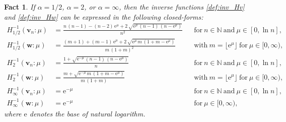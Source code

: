 \documentclass[conference, draftcls, onecolumn]{IEEEtran}
\theoremstyle{plain}
\newtheorem{fact}{Fact}
\newcommand{\bvec}[1]{\boldsymbol{#1}}
\begin{document}
\begin{fact}
\label{ex:renyi}
If $\alpha = 1/2$, $\alpha = 2$, or $\alpha = \infty$, then the inverse functions \eqref{def:inv_Hv} and \eqref{def:inv_Hw} can be expressed in the following closed-forms:
\begin{align}
H_{1/2}^{-1}( \bvec{v}_{n} : \mu )
& =
\frac{ n \, (n - 1) - (n-2) \, \mathrm{e}^{\mu} + 2 \, \sqrt{ \mathrm{e}^{\mu} \, (n-1) \, (n-\mathrm{e}^{\mu}) } }{ n^{2} }
&& \mathrm{for} \ n \in \mathbb{N} \ \mathrm{and} \ \mu \in [0, \ln n] ,
\\
H_{1/2}^{-1}( \bvec{w} : \mu )
& =
\frac{ (m+1) + (m-1) \, \mathrm{e}^{\mu} + 2 \, \sqrt{ \mathrm{e}^{\mu} \, m \, (1 + m - \mathrm{e}^{\mu})} }{ m \, (1+m)^{2} }
&& \mathrm{with} \ m = \lfloor \mathrm{e}^{\mu} \rfloor \ \mathrm{for} \ \mu \in [0, \infty) ,
\\
H_{2}^{-1}( \bvec{v}_{n} : \mu )
& =
\frac{ 1 + \sqrt{ \mathrm{e}^{-\mu} \, (n-1) \, (n-\mathrm{e}^{\mu}) } }{ n }
&& \mathrm{for} \ n \in \mathbb{N} \ \mathrm{and} \ \mu \in [0, \ln n] ,
\\
H_{2}^{-1}( \bvec{w} : \mu )
& =
\frac{ m + \sqrt{ \mathrm{e}^{-\mu} \, m \, (1 + m - \mathrm{e}^{\mu}) } }{ m \, (1+m) }
&& \mathrm{with} \ m = \lfloor \mathrm{e}^{\mu} \rfloor \ \mathrm{for} \ \mu \in [0, \infty) ,
\\
H_{\infty}^{-1}( \bvec{v}_{n} : \mu )
& =
\mathrm{e}^{-\mu}
&& \mathrm{for} \ n \in \mathbb{N} \ \mathrm{and} \ \mu \in [0, \ln n] ,
\label{eq:inv_Hv_infty} \\
H_{\infty}^{-1}( \bvec{w} : \mu )
& =
\mathrm{e}^{-\mu}
&& \mathrm{for} \ \mu \in [0, \infty) ,
\end{align}
where $\mathrm{e}$ denotes the base of natural logarithm.
\end{fact}
\end{document}
